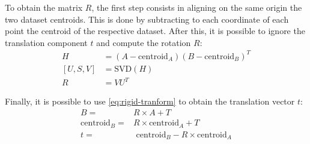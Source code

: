 To obtain the matrix $R$, the first step consists in aligning on the same origin the two dataset centroids. This is done by subtracting to each coordinate of each point the centroid of the respective dataset. After this, it is possible to ignore the translation component $t$ and compute the rotation $R$:
\begin{equation}
    \begin{aligned}
        H         & = (A-\textrm{centroid}_A)(B-\textrm{centroid}_B)^T \\
        [U, S, V] & = \textrm{SVD}(H)                                          \\
        R         & = VU^T
    \end{aligned}
    \label{eq:rotation-matrix}
\end{equation}

Finally, it is possible to use \cref{eq:rigid-tranform} to obtain the translation vector $t$:
\begin{equation}
    \begin{aligned}
        B =                   & R\times A + T                                     \\
        \textrm{centroid}_B = & R\times \textrm{centroid}_A + T                   \\
        t =                   & \textrm{ centroid}_B - R\times \textrm{centroid}_A
    \end{aligned}
    \label{eq:translation-vector}
\end{equation}
